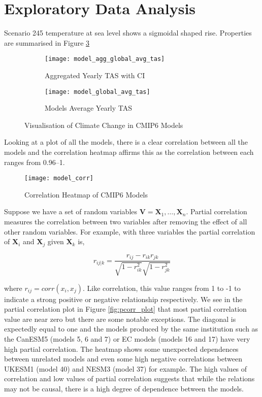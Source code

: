 \documentclass[honours,12pt]{unswthesis}
\numberwithin{equation}{section}
\begin{document}
\section{Exploratory Data Analysis}\label{eda}
Scenario 245 temperature at sea level shows a sigmoidal shaped rise. Properties are summarised in Figure \ref{fig:cmip6_plots}
\begin{figure}[H]
    \centering
    \begin{subfigure}[b]{0.45\textwidth}
        \centering
        \texttt{[image: model\_agg\_global\_avg\_tas]}
        \caption{Aggregated Yearly TAS with CI}
        \label{fig:agg_models}
    \end{subfigure}
    \hfill
    \begin{subfigure}[b]{0.45\textwidth}
        \centering
        \texttt{[image: model\_global\_avg\_tas]}
        \caption{Models Average Yearly TAS}
        \label{fig:model_avgs}
    \end{subfigure}
    \caption{Visualisation of Climate Change in CMIP6 Models}
    \label{fig:cmip6_plots}
\end{figure}

{\noindent}Looking at a plot of all the models, there is a clear correlation between all the models and the correlation heatmap affirms this as the correlation between each
ranges from 0.96--1.

\begin{figure}[H]
    \centering
    \texttt{[image: model\_corr]}
    \caption{Correlation Heatmap of CMIP6 Models}
    \label{fig:corr_plot}
\end{figure}

{\noindent}Suppose we have a set of random variables $\textbf{V} = \textbf{X}_1, \dots, \textbf{X}_n$. 
Partial correlation measures the correlation between two variables after removing the effect of all other random variables.\cite{kim2015ppcor}
For example, with three variables the partial correlation of $\textbf{X}_i$ and $\textbf{X}_j$ given $\textbf{X}_k$ is,

\begin{equation}
    r_{ij|k} = \frac{r_{ij} - r_{ik}r_{jk}}{\sqrt{1-r^2_{ik}} \sqrt{1-r^2_{jk}}}
\end{equation}

{\noindent}where $r_{ij} = corr(x_i, x_j)$. Like correlation, this value ranges from 1 to -1 to indicate a strong positive or negative relationship respectively.
We see in the partial correlation plot in Figure \ref{fig:pcorr_plot} that most partial correlation value are near zero but there are some notable exceptions.
The diagonal is expectedly equal to one and the models produced by the same institution such as the CanESM5 (models 5, 6 and 7) or EC models (models 16 and 17) have very high partial correlation.
The heatmap shows some unexpected dependences between unrelated models and even some high negative correlations between UKESM1 (model 40) and NESM3 (model 37) for example.
The high values of correlation and low values of partial correlation suggests that while the relations may not be causal, there is a high degree of dependence between the models.
\end{document}
